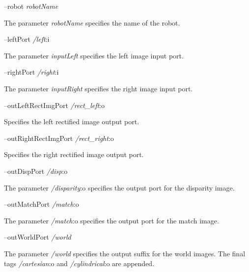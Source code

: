 --robot {\itshape robot\+Name} 
\begin{DoxyItemize}
\item The parameter {\itshape robot\+Name} specifies the name of the robot.
\end{DoxyItemize}

--left\+Port {\itshape /left}\+:i
\begin{DoxyItemize}
\item The parameter {\itshape input\+Left} specifies the left image input port.
\end{DoxyItemize}

--right\+Port {\itshape /right}\+:i
\begin{DoxyItemize}
\item The parameter {\itshape input\+Right} specifies the right image input port.
\end{DoxyItemize}

--out\+Left\+Rect\+Img\+Port {\itshape /rect\+\_\+left}\+:o
\begin{DoxyItemize}
\item Specifies the left rectified image output port.
\end{DoxyItemize}

--out\+Right\+Rect\+Img\+Port {\itshape /rect\+\_\+right}\+:o
\begin{DoxyItemize}
\item Specifies the right rectified image output port.
\end{DoxyItemize}

--out\+Disp\+Port {\itshape /disp}\+:o
\begin{DoxyItemize}
\item The parameter {\itshape /disparity}\+:o specifies the output port for the disparity image.
\end{DoxyItemize}

--out\+Match\+Port {\itshape /match}\+:o
\begin{DoxyItemize}
\item The parameter {\itshape /match}\+:o specifies the output port for the match image.
\end{DoxyItemize}

--out\+World\+Port {\itshape /world} 
\begin{DoxyItemize}
\item The parameter {\itshape /world} specifies the output suffix for the world images. The final tags {\itshape /cartesian}\+:o and {\itshape /cylindrical}\+:o are appended.
\end{DoxyItemize}

